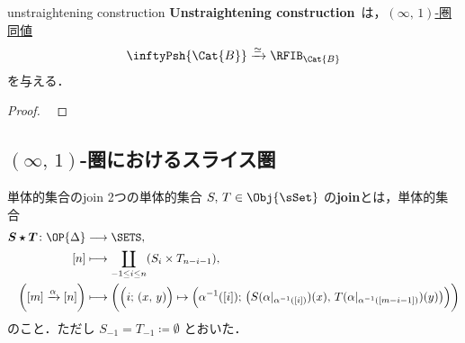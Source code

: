 \documentclass[TQFT_main]{subfiles}
\begin{document}
\begin{mytheo}[label=thm:unstraightening]{unstraightening construction}
    \textbf{Unstraightening construction}~\cite[Theorem 2.2.1.2.]{lurie2008higher}は，\hyperref[def:equiv-infty]{$(\infty,\, 1)$-圏同値}
    \begin{align}
        \inftyPsh{\Cat{B}} \xrightarrow{\simeq} \RFIB_{\Cat{B}}
    \end{align}
    を与える．
\end{mytheo}

\begin{proof}
    ~\cite[Proposition 2.2.3.11]{lurie2008higher}
\end{proof}

\subsection{{$(\infty,\, 1)$}-圏におけるスライス圏}

\begin{mydef}[label=def:Simp-Join]{単体的集合のjoin}
    2つの単体的集合 $S,\, T \in \Obj{\sSet}$ の\textbf{join}とは，単体的集合
    \begin{align}
        \bm{S \star T} \colon \OP{\Delta} &\lto \SETS, \\
        [n] &\lmto \coprod_{-1 \le i \le n} (S_i \times T_{n-i-1}), \\
        \biggl( [m] \xrightarrow{\alpha} [n] \biggr) &\lmto \biggl( \Bigl( i;\, (x,\, y) \Bigr) \mapsto \Bigl( \alpha^{-1}([i]);\, \bigl(S(\alpha|_{\alpha^{-1}([i])})(x),\, T(\alpha|_{\alpha^{-1}([m-i-1])})(y) \bigr)  \Bigr)  \biggr) 
    \end{align}
    のこと．ただし $S_{-1} = T_{-1} \coloneqq \emptyset$ とおいた．
\end{mydef}
\end{document}
